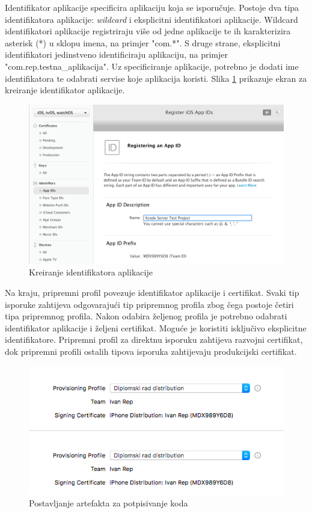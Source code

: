 \documentclass[times, utf8, diplomski, numeric]{fer}
\begin{document}
\begin{appendices}
Identifikator aplikacije specificira aplikaciju koja se isporučuje. Postoje dva tipa identifikatora aplikacije: \textit{wildcard} i eksplicitni identifikatori aplikacije. Wildcard identifikatori aplikacije registriraju više od jedne aplikacije te ih karakterizira asterisk (*) u sklopu imena, na primjer "com.*". S druge strane, eksplicitni identifikatori jedinstveno identificiraju aplikaciju, na primjer "com.rep.testna\_aplikacija". Uz specificiranje aplikacije, potrebno je dodati ime identifikatora te odabrati servise koje aplikacija koristi. Slika \ref{fig:AppIdentifierCreation} prikazuje ekran za kreiranje identifikator aplikacije.

\begin{figure}
\centering
\includegraphics[scale=0.4]{AppIdentifierCreation}
\caption{Kreiranje identifikatora aplikacije}
\label{fig:AppIdentifierCreation}
\end{figure}

Na kraju, pripremni profil povezuje identifikator aplikacije i certifikat. Svaki tip isporuke zahtijeva odgovarajući tip pripremnog profila zbog čega postoje četiri tipa pripremnog profila. Nakon odabira željenog profila je potrebno odabrati identifikator aplikacije i željeni certifikat. Moguće je koristiti isključivo eksplicitne identifikatore. Pripremni profil za direktnu isporuku zahtijeva razvojni certifikat, dok pripremni profili ostalih tipova isporuka zahtijevaju produkcijski certifikat.

\begin{figure}[b!]
\centering
\includegraphics[scale=0.6]{SigningArtefactsSetup}
\caption{Postavljanje artefakta za potpisivanje koda}
\label{fig:SigningArtefactsSetup}
\end{figure}


\end{appendices}
\end{document}
